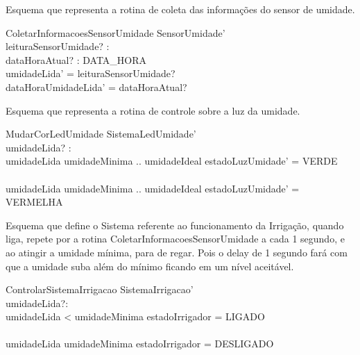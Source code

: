             Esquema que representa a rotina de coleta das informações do sensor de umidade.
            \begin{schema}{ColetarInformacoesSensorUmidade}
                \Delta SensorUmidade' \\
                leituraSensorUmidade? : \nat \\
                dataHoraAtual? : DATA\_HORA \\
            \where
                umidadeLida' = leituraSensorUmidade? \\
                dataHoraUmidadeLida' = dataHoraAtual? \\
            \end{schema}

            \newpage
            Esquema que representa a rotina de controle sobre a luz da umidade.
            \begin{schema}{MudarCorLedUmidade}
                \Delta SistemaLedUmidade' \\
                umidadeLida? : \nat \\
            \where
                umidadeLida \in umidadeMinima .. umidadeIdeal \implies estadoLuzUmidade' = VERDE \\
                \lor \\
                umidadeLida \notin umidadeMinima .. umidadeIdeal \implies estadoLuzUmidade' = VERMELHA \\
            \end{schema}            

            Esquema que define o Sistema referente ao funcionamento da Irrigação, quando liga, repete por a rotina 
            ColetarInformacoesSensorUmidade a cada 1 segundo, e ao atingir a umidade mínima, para de regar. Pois o delay de 1 segundo
            fará com que a umidade suba além do mínimo ficando em um nível aceitável.
            \begin{schema}{ControlarSistemaIrrigacao}
                \Delta SistemaIrrigacao' \\
                umidadeLida?: \nat \\ 
            \where
                umidadeLida < umidadeMinima \implies estadoIrrigador = LIGADO  \\
                \lor \\
                umidadeLida \geq umidadeMinima \implies estadoIrrigador = DESLIGADO  \\
            \end{schema}

